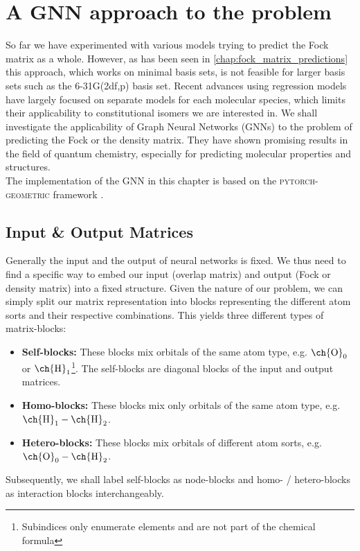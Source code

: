 \chapter{A GNN approach to the problem}
\label{chap:gnn}
So far we have experimented with various models trying to predict the Fock matrix as a whole. However, as has been seen in \autoref{chap:fock_matrix_predictions} this approach, which works on minimal basis sets, is not feasible for larger basis sets such as the 6-31G(2df,p) basis set. Recent advances using regression models have largely focused on separate models for each molecular species, which limits their applicability to constitutional isomers we are interested in. \parencite{ref:Hazra2024,ref:Shao2023}
We shall investigate the applicability of Graph Neural Networks (GNNs) to the problem of predicting the Fock or the density matrix. They have shown promising results in the field of quantum chemistry, especially for predicting molecular properties and structures. \parencite{ref:schnet2018}\\

The implementation of the GNN in this chapter is based on the \textsc{pytorch-geometric} framework \parencite{ref:PyTorchGeometric, ref:PyTorch_geom_paper}. 
\section{Input \& Output Matrices}
\label{sec:gnn_input_output_matrices}
Generally the input and the output of neural networks is fixed. We thus need to find a specific way to embed our input (overlap matrix) and output (Fock or density matrix) into a fixed structure. Given the nature of our problem, we can simply split our matrix representation into blocks representing the different atom sorts and their respective combinations. This yields three different types of matrix-blocks: 
\begin{itemize}
    \item \textbf{Self-blocks:} These blocks mix orbitals of the same atom type, e.g. $\text{\ch{O}}_0$ or $\text{\ch{H}}_1$\footnote{Subindices only enumerate elements and are not part of the chemical formula}. The self-blocks are diagonal blocks of the input and output matrices.
    \item \textbf{Homo-blocks:} These blocks mix only orbitals of the same atom type, e.g. $\text{\ch{H}}_1 - \text{\ch{H}}_2$.
    \item \textbf{Hetero-blocks:} These blocks mix orbitals of different atom sorts, e.g. $\text{\ch{O}}_0 - \text{\ch{H}}_2$.
\end{itemize}
Subsequently, we shall label self-blocks as node-blocks and homo- / hetero-blocks as interaction blocks interchangeably. 

